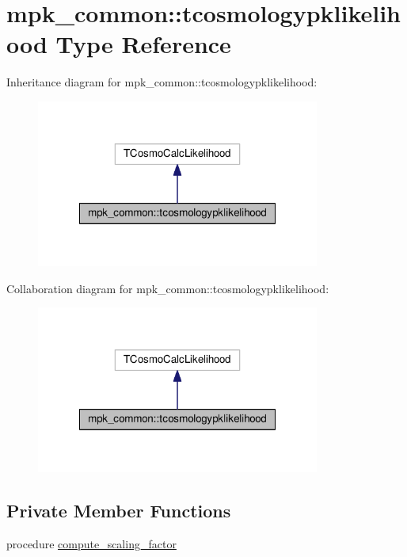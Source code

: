 \hypertarget{structmpk__common_1_1tcosmologypklikelihood}{}\section{mpk\+\_\+common\+:\+:tcosmologypklikelihood Type Reference}
\label{structmpk__common_1_1tcosmologypklikelihood}


Inheritance diagram for mpk\+\_\+common\+:\+:tcosmologypklikelihood\+:
\nopagebreak
\begin{figure}[H]
\begin{center}
\leavevmode
\includegraphics[width=264pt]{structmpk__common_1_1tcosmologypklikelihood__inherit__graph}
\end{center}
\end{figure}


Collaboration diagram for mpk\+\_\+common\+:\+:tcosmologypklikelihood\+:
\nopagebreak
\begin{figure}[H]
\begin{center}
\leavevmode
\includegraphics[width=264pt]{structmpk__common_1_1tcosmologypklikelihood__coll__graph}
\end{center}
\end{figure}
\subsection*{Private Member Functions}
\begin{DoxyCompactItemize}
\item 
procedure \mbox{\hyperlink{structmpk__common_1_1tcosmologypklikelihood_a2d3f108d2221aed0b2a07d7ef4e61b5b}{compute\+\_\+scaling\+\_\+factor}}
\end{DoxyCompactItemize}
